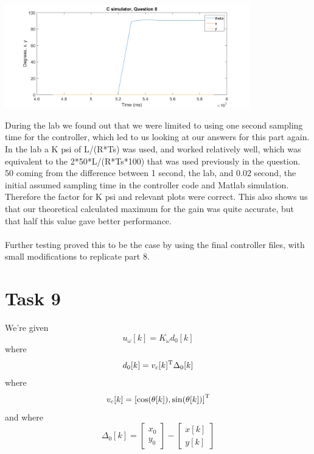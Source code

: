 \documentclass[a4paper,12pt,oneside,onecolumn]{article} %
\begin{document}
   \begin{center}
  \includegraphics[width = 0.8\textwidth]{q8simulation}
 \end{center}
 

During the lab we found out that we were limited to using one second sampling time for the controller, which led to us looking at our answers for this part again. In the lab a K psi of L/(R*Ts) was used, and worked relatively well, which was equivalent to the 2*50*L/(R*Ts*100) that was used previously in the question. 50 coming from the difference between 1 second, the lab, and 0.02 second, the initial assumed sampling time in the controller code and Matlab simulation. Therefore the factor for K psi and relevant plots were correct. This also shows us that our theoretical calculated maximum for the gain was quite accurate, but that half this value gave better performance.\\
\\
Further testing proved this to be the case by using the final controller files, with small modifications to replicate part 8.
\section*{Task 9}

We're given
\begin{equation}
u_{\omega} [k] = K_\omega d_0[k]
\end{equation}
where
\begin{equation}
d_0[k] = v_c[k]^{\rm T} \Delta_0[k]
\end{equation}
where
\begin{equation}
\label{eq:ex9vc}
v_c[k] = \left[ \cos(\theta[k]), \sin(\theta[k]) \right]^{\rm T}
\end{equation}
and where
\begin{equation}
\Delta_0[k] = \begin{bmatrix}
x_0 \\ y_0
\end{bmatrix}
-
\begin{bmatrix}
x[k] \\ y[k]
\end{bmatrix}
\end{equation}
\end{document}
